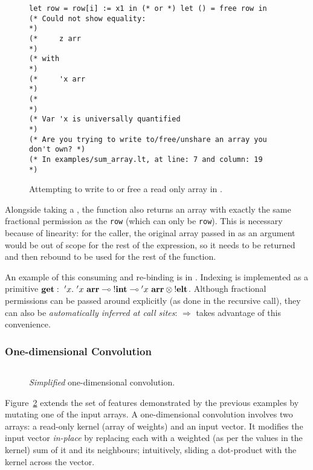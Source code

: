 \begin{figure}[t]
    \centering
    \begin{verbatim}
let row = row[i] := x1 in (* or *) let () = free row in
(* Could not show equality:                                        *)
(*     z arr                                                       *)
(* with                                                            *)
(*     'x arr                                                      *)
(*                                                                 *)
(* Var 'x is universally quantified                                *)
(* Are you trying to write to/free/unshare an array you don't own? *)
(* In examples/sum_array.lt, at line: 7 and column: 19             *)
    \end{verbatim}
    \caption{Attempting to write to or free a read only array in
    \lang.}\label{fig:lang_errormsg}
\end{figure}

Alongside taking a , the function also returns an array
with exactly the same fractional permission as the \texttt{row} (which can only
be \texttt{row}).  This is necessary because of linearity: for the caller, the
original array passed in as an argument would be out of scope for the rest of
the expression, so it needs to be returned and then rebound to be used for the
rest of the function.

An example of this consuming and re-binding is in . Indexing is implemented as a primitive $\ottkw{get}:\ {'x}.\ {{'x}\
\Arr} \multimap {!\Int} \multimap {'x\ \Arr} \otimes {!\Elt}$.
Although fractional permissions can be passed around explicitly  (as done in
the recursive call), they can also be \emph{automatically inferred at call
sites}: \highl{row[i]} $\Rightarrow$ \highl{get _ row i} takes advantage of
this convenience.

\subsubsection{One-dimensional Convolution}

\begin{figure}[t]
    \centering
    \inputminted[fontsize=\small]{ocaml}{../../examples/weighted_avg_infer.lt}
    \caption{\emph{Simplified} one-dimensional convolution.}\label{fig:lang_oned_conv}
\end{figure}

Figure~\ref{fig:lang_oned_conv} extends the set of features demonstrated by the
previous examples by mutating one of the input arrays. A one-dimensional
convolution involves two arrays: a read-only kernel (array of weights) and an
input vector. It modifies the input vector \emph{in-place} by replacing each
\highl{write[i]} with a weighted (as per the values in the kernel) sum of it
and its neighbours; intuitively, sliding a dot-product with the kernel across
the vector.

